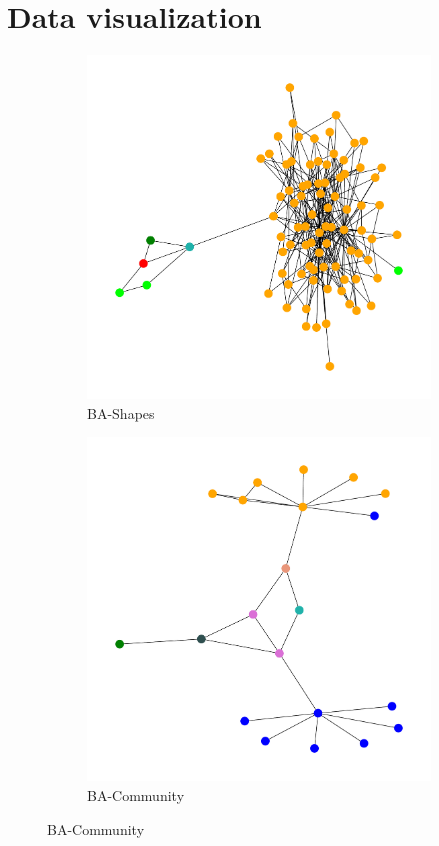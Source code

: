 \clearpage
\section{Data visualization}

\begin{figure}[H]
    \centering
    \begin{subfigure}[b]{0.4\textwidth}
        \includegraphics[width=\textwidth]{img/BA-Shapes-VIS-COMP-GRAPH.pdf}
        \caption{BA-Shapes}
    \end{subfigure}
    \hfill
    \begin{subfigure}[b]{0.4\textwidth}
        \includegraphics[width=\textwidth]{img/BA-Community-VIS-COMP-GRAPH.pdf}
        \caption{BA-Community}
    \end{subfigure}
    

\end{figure}
